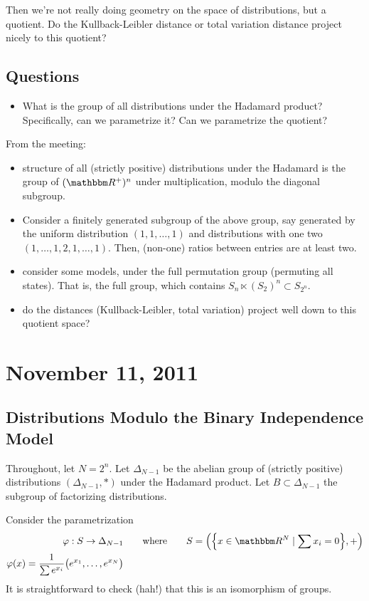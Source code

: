 \documentclass[12pt]{article}
\begin{document}
Then we're not really doing geometry on the space of distributions, but a
quotient.  Do the Kullback-Leibler distance or total variation distance project
nicely to this quotient?

\subsection{Questions}
\begin{itemize}
    \item What is the group of all distributions under the Hadamard product?
    Specifically, can we parametrize it?  Can we parametrize the quotient?
\end{itemize}

From the meeting:

\begin{itemize}
    \item structure of all (strictly positive) distributions under the Hadamard
    is the group of $(\R^+)^n$ under multiplication, modulo the diagonal
    subgroup.
    \item Consider a finitely generated subgroup of the above group, say
    generated by the uniform distribution $(1,1,\ldots, 1)$ and distributions
    with one two $(1,\ldots, 1,2,1, \ldots, 1)$.  Then, (non-one) ratios between
    entries are at least two.
    \item consider some models, under the full permutation group (permuting all
    states).  That is, the full group, which contains $S_n \ltimes (S_2)^n
    \subset S_{2^n}$.
    \item do the distances (Kullback-Leibler, total variation) project well down
    to this quotient space?
\end{itemize}

\section{November 11, 2011}

\subsection{Distributions Modulo the Binary Independence Model}

Throughout, let $N = 2^n$.  Let $\Delta_{N-1}$ be the abelian group of (strictly
positive) distributions $(\Delta_{N-1}, *)$ under the Hadamard product.  Let $B
\subset \Delta_{N-1}$ the subgroup of factorizing distributions.

Consider the parametrization
\begin{align*}
    \varphi : S \to \Delta_{N-1}
    &\qquad\text{where}\qquad
    S = \pdel*{\cdel*{x \in \R^N \mid \sum x_i = 0}, +} \\
    \varphi(x) = \frac{1}{\sum e^{x_i}}\pdel[\big]{e^{x_1}, \ldots, e^{x_N}}
\end{align*}
It is straightforward to check (hah!) that this is an isomorphism of groups.
\end{document}
